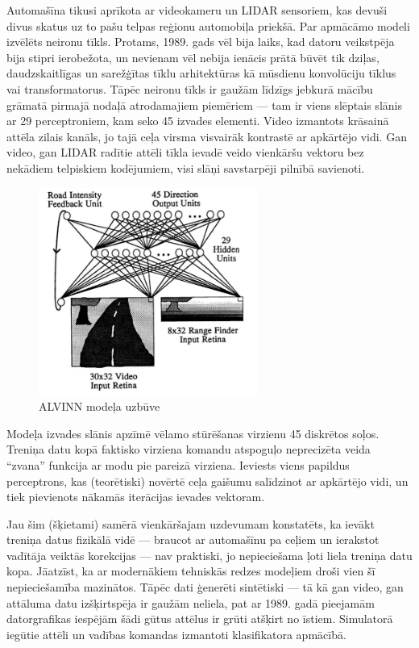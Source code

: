 \documentclass[12pt, a4paper]{article}
\numberwithin{equation}{section} %
\begin{document}
Automašīna tikusi aprīkota ar videokameru un LIDAR sensoriem, kas devuši divus skatus uz to pašu telpas reģionu automobiļa priekšā. Par apmācāmo modeli izvēlēts neironu tīkls. Protams, 1989. gads vēl bija laiks, kad datoru veikstpēja bija stipri ierobežota, un nevienam vēl nebija ienācis prātā būvēt tik dziļas, daudzskaitlīgas un sarežģītas tīklu arhitektūras kā mūsdienu konvolūciju tīklus vai transformatorus. Tāpēc neironu tīkls ir gaužām līdzīgs jebkurā mācību grāmatā pirmajā nodaļā atrodamajiem piemēriem --- tam ir viens slēptais slānis ar 29 perceptroniem, kam seko 45 izvades elementi. Video izmantots krāsainā attēla zilais kanāls, jo tajā ceļa virsma visvairāk kontrastē ar apkārtējo vidi. Gan video, gan LIDAR radītie attēli tīkla ievadē veido vienkāršu vektoru bez nekādiem telpiskiem kodējumiem, visi slāņi savstarpēji pilnībā savienoti.

\begin{figure}[t!]
    \centering
    \includegraphics[height=6.8cm,page=1]{../img/alvinn_architecture.png}
    \caption{ALVINN modeļa uzbūve \cite{pomerleau1989alvinn}}
\end{figure}

Modeļa izvades slānis apzīmē vēlamo stūrēšanas virzienu 45 diskrētos soļos. Treniņa datu kopā faktisko virziena komandu atspoguļo neprecizēta veida ``zvana'' funkcija ar modu pie pareizā virziena. Ieviests viens papildus perceptrons, kas (teorētiski) novērtē ceļa gaišumu salīdzinot ar apkārtējo vidi, un tiek pievienots nākamās iterācijas ievades vektoram.

Jau šim (šķietami) samērā vienkāršajam uzdevumam konstatēts, ka ievākt treniņa datus fizikālā vidē --- braucot ar automašīnu pa ceļiem un ierakstot vadītāja veiktās korekcijas --- nav praktiski, jo nepieciešama ļoti liela treniņa datu kopa. Jāatzīst, ka ar modernākiem tehniskās redzes modeļiem droši vien šī nepieciešamība mazinātos. Tāpēc dati ģenerēti sintētiski --- tā kā gan video, gan attāluma datu izšķirtspēja ir gaužām neliela, pat ar 1989. gadā pieejamām datorgrafikas iespējām šādi gūtus attēlus ir grūti atšķirt no īstiem. Simulatorā iegūtie attēli un vadības komandas izmantoti klasifikatora apmācībā.
\end{document}

